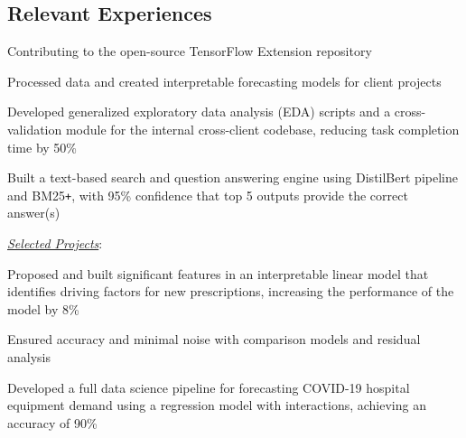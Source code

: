 \documentclass{mxresume}
\begin{document}
\begin{minipage}[t]{0.72\textwidth}
\begin{resumebody}
\begin{large}

\section*{Relevant Experiences}
%
\begin{tightemize}{5mm}
\item Contributing to the open-source TensorFlow Extension repository
\end{tightemize}
%
%
\begin{tightemize}{5mm}
\item Processed data and created interpretable forecasting models for client projects
\item Developed generalized exploratory data analysis (EDA) scripts and a cross-validation module for the internal cross-client codebase, reducing task completion time by 50\textsc{\%}
\item Built a text-based search and question answering engine using DistilBert pipeline and BM25\texttt{+}, with 95\textsc{\%} confidence that top 5 outputs provide the correct answer(s)
\end{tightemize}
\sectionenumPad
\emph{\underline{Selected Projects}}: \\[1.5mm]
\begin{tightemize}{5mm}
\item Proposed and built significant features in an interpretable linear model that identifies driving factors for new prescriptions, increasing the performance of the model by 8\textsc{\%}
\item Ensured accuracy and minimal noise with comparison models and residual analysis
\end{tightemize}
\sectionenumPad
{}
\begin{tightemize}{5mm}
\item Developed a full data science pipeline for forecasting COVID-19 hospital equipment demand using a regression model with interactions, achieving an accuracy of 90\textsc{\%}
\end{tightemize}

\end{large}
\end{resumebody}
\end{minipage}
\end{document}
